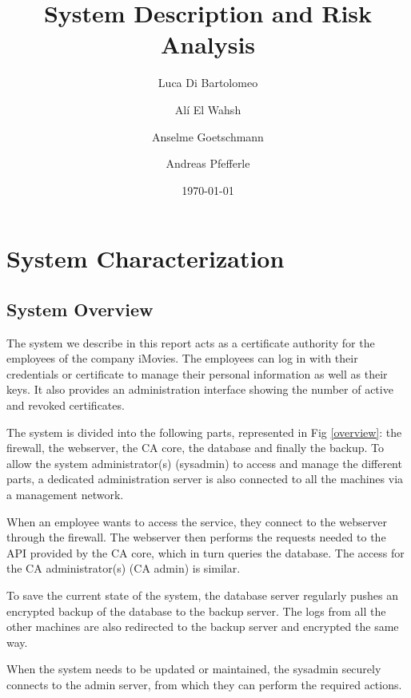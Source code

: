 \documentclass[english]{article}
\title{\huge\sffamily\bfseries System Description and Risk Analysis}
\author{Luca Di Bartolomeo \and Al\'{i}  El Wahsh \and Anselme Goetschmann \and Andreas Pfefferle}
\date{\today}
\begin{document}
\maketitle


\setcounter{tocdepth}{2}
\tableofcontents
\pagebreak


\section{System Characterization}

\subsection{System Overview}

The system we describe in this report acts as a certificate authority for the employees of the company iMovies. The employees can log in with their credentials or certificate to manage their personal information as well as their keys. It also provides an administration interface showing the number of active and revoked certificates.

The system is divided into the following parts, represented in Fig \ref{overview}: the firewall, the webserver, the CA core, the database and finally the backup. To allow the system administrator(s) (sysadmin) to access and manage the different parts, a dedicated administration server is also connected to all the machines via a management network.

When an employee wants to access the service, they connect to the webserver through the firewall. The webserver then performs the requests needed to the API provided by the CA core, which in turn queries the database. The access for the CA administrator(s) (CA admin) is similar.

To save the current state of the system, the database server regularly pushes an encrypted backup of the database to the backup server. The logs from all the other machines are also redirected to the backup server and encrypted the same way.

When the system needs to be updated or maintained, the sysadmin securely connects to the admin server, from which they can perform the required actions.
\end{document}
